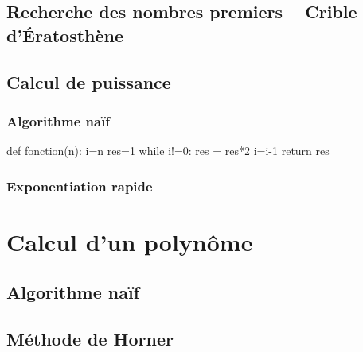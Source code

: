 \documentclass[10pt]{article}
\begin{document}
\subsection{Recherche des nombres premiers -- Crible d'Ératosthène}
\subsection{Calcul de puissance}
\subsubsection{Algorithme naïf}
\begin{py}
\begin{python}
def fonction(n):
    i=n
    res=1
    while i!=0:
        res = res*2
        i=i-1
    return res
\end{python}
\end{py}
\subsubsection{Exponentiation rapide}
\section{Calcul d'un polynôme}
\subsection{Algorithme naïf}
\subsection{Méthode de Horner}

\end{document}
